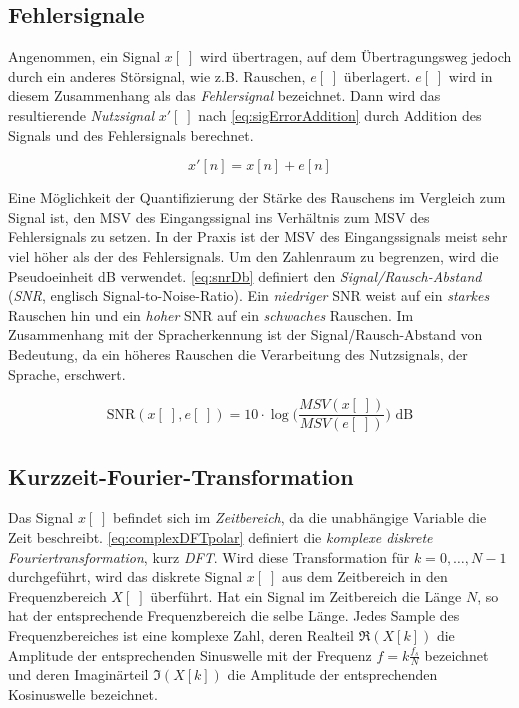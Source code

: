 
\subsection{Fehlersignale}

Angenommen, ein Signal $x[\;]$ wird übertragen, auf dem Übertragungsweg jedoch durch ein anderes Störsignal, wie z.B. Rauschen, $e[\;]$ überlagert. $e[\;]$ wird in diesem Zusammenhang als das \emph{Fehlersignal} bezeichnet. Dann wird das resultierende \emph{Nutzsignal} $x'[\;]$ nach \autoref{eq:sigErrorAddition} durch Addition des Signals und des Fehlersignals berechnet.\cite[S. 29]{dspMichigan}

\begin{equation}
x'[n] = x[n] + e[n]
\label{eq:sigErrorAddition}
\end{equation}

Eine Möglichkeit der Quantifizierung der Stärke des Rauschens im Vergleich zum Signal ist, den MSV des Eingangssignal ins Verhältnis zum MSV des Fehlersignals zu setzen. In der Praxis ist der MSV des Eingangssignals meist sehr viel höher als der des Fehlersignals. Um den Zahlenraum zu begrenzen, wird die Pseudoeinheit dB verwendet. \autoref{eq:snrDb} definiert den \emph{Signal/Rausch-Abstand} (\emph{SNR}, englisch Signal-to-Noise-Ratio). Ein \emph{niedriger} SNR weist auf ein \emph{starkes} Rauschen hin und ein \emph{hoher} SNR auf ein \emph{schwaches} Rauschen. Im Zusammenhang mit der Spracherkennung ist der Signal/Rausch-Abstand von Bedeutung, da ein höheres Rauschen die Verarbeitung des Nutzsignals, der Sprache, erschwert.\cite{matlabSNR}

\begin{equation}
\text{SNR}(x[\;],e[\;]) = 10 \cdot  \log \Big(\frac{MSV(x[\;])}{MSV(e[\;])} \Big) \text{ dB}
\label{eq:snrDb}
\end{equation}

\subsection{Kurzzeit-Fourier-Transformation}
\label{sec:stft}

Das Signal $x[\;]$ befindet sich im \emph{Zeitbereich}, da die unabhängige Variable die Zeit beschreibt. \autoref{eq:complexDFTpolar} definiert die \emph{komplexe diskrete Fouriertransformation}, kurz \emph{DFT}. Wird diese Transformation für $k = 0 , \ldots , N-1$ durchgeführt, wird das diskrete Signal $x[\;]$ aus dem Zeitbereich in den Frequenzbereich $X[\;]$ überführt. Hat ein Signal im Zeitbereich die Länge $N$, so hat der entsprechende Frequenzbereich die selbe Länge. Jedes Sample des Frequenzbereiches ist eine komplexe Zahl, deren Realteil $\Re(X[k])$ die Amplitude der entsprechenden Sinuswelle mit der Frequenz $f = k\frac{f_s}{N}$ bezeichnet und deren Imaginärteil  $\Im(X[k])$ die Amplitude der entsprechenden Kosinuswelle bezeichnet.\cite[S. 149, S. 567 - 571]{dspGuide} \cite[S. 60]{sprachverarbeitung}

